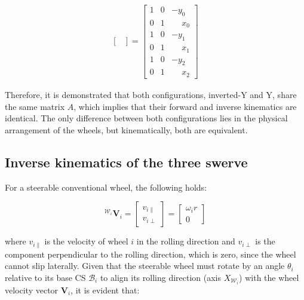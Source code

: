\documentclass[11pt,a4paper]{article}
\newcommand{\vect}[1]{\bm{#1}}       %
\newcommand{\frameBi}{\mathcal{B}_i}
\newcommand{\frameWi}{\mathcal{W}_i}
\begin{document}
\begin{equation}
\begin{aligned}
\begin{bmatrix}
              \end{bmatrix} = \begin{bmatrix}
                                  1 & 0 & -y_0           \\
                                  0 & 1 & \phantom{-}x_0 \\
                                  1 & 0 & -y_1           \\
                                  0 & 1 & \phantom{-}x_1 \\
                                  1 & 0 & -y_2           \\
                                  0 & 1 & \phantom{-}x_2
                              \end{bmatrix}
    \end{aligned}
\end{equation}

Therefore, it is demonstrated that both configurations, inverted-Y and Y, share the same matrix \(A\), which implies that their forward and inverse kinematics are identical. The only difference between both configurations lies in the physical arrangement of the wheels, but kinematically, both are equivalent.

\subsection{Inverse kinematics of the three swerve}

For a steerable conventional wheel, the following holds:

\begin{equation}
    {}^{\frameWi}\vect{V}_{i} = \begin{bmatrix}
        v_{i\parallel} \\
        v_{i\perp}
    \end{bmatrix} = \begin{bmatrix}
        \omega_i r \\
        0
    \end{bmatrix}
\end{equation}

where \(v_{i\parallel}\) is the velocity of wheel \(i\) in the rolling direction and \(v_{i\perp}\) is the component perpendicular to the rolling direction, which is zero, since the wheel cannot slip laterally. Given that the steerable wheel must rotate by an angle \(\theta_i\) relative to its base CS \(\frameBi\) to align its rolling direction (axis \(X_{\frameWi}\)) with the wheel velocity vector \(\vect{V}_i\), it is evident that:
\end{document}
